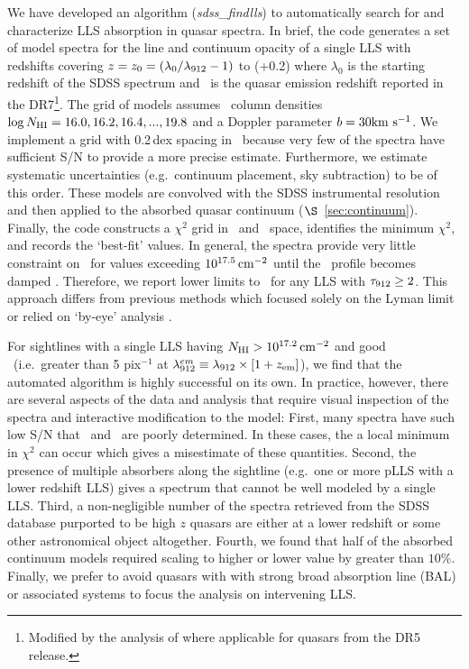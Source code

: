 \documentclass[12pt,preprint]{aastex}
\begin{document}
We have developed an algorithm ({\it sdss\_findlls})
to automatically search for
and characterize LLS absorption in quasar spectra.
In brief, the code generates a set of model spectra
for the line and continuum opacity of
a single LLS with redshifts covering 
$z=z_0=(\lambda_0/\lambda_{\rm 912}-1)$ to (\zem+0.2) where $\lambda_0$
is the starting redshift of the SDSS spectrum and \zem\ is the
quasar emission redshift reported in the DR7\footnote{Modified by
the analysis of \cite{phh08} where applicable for quasars from 
the DR5 release.}.
The grid of models assumes \nhi\ column densities 
$\log N_{\rm HI} = 16.0, 16.2, 16.4, ..., 19.8$
and a Doppler parameter $b = 30 {\rm km~s^{-1}}$.  
We implement a grid with 0.2\,dex spacing in \nhi\ because very
few of the spectra have sufficient S/N to provide a more precise
estimate.  Furthermore, we estimate systematic uncertainties
(e.g.\ continuum placement, sky subtraction) to be of this order.
These models are convolved with the SDSS instrumental
resolution and then applied to the absorbed quasar continuum 
($\S$~\ref{sec:continuum}).
Finally, the code constructs a $\chi^2$ grid in \zlls\ and \nhi\
space, identifies the minimum $\chi^2$, and records the `best-fit' values.  
In general, the spectra provide very little constraint
on \nhi\ for values exceeding $10^{17.5} \, {\rm cm^{-2}}$ until the \lya\
profile becomes damped \citep[e.g.][]{phw05}.
Therefore, we report lower limits to \nhi\ for any LLS with 
$\tau_{\rm 912} \ge 2$.  This approach differs from previous methods
which focused solely on the Lyman limit \citep[e.g.][]{sl94} or
relied on `by-eye' analysis \citep{lzt9X}.

For sightlines with a single LLS having $N_{\rm HI} > 10^{17.2} \, {\rm cm^{-2}}$
and good \sna\ (i.e.\ greater than 5 pix$^{-1}$ 
at $\lambda_{\rm 912}^{em} \equiv \lambda_{\rm 912} \times [1+z_{\rm em}]$),
we find that the automated
algorithm is highly successful on its own.
In practice, however, there are several aspects of the data and
analysis that require visual inspection of the spectra
and interactive modification to the model:
First, many spectra have 
such low S/N that \zlls\ and \nhi\ are poorly determined.
In these cases, the a local minimum in $\chi^2$ can occur which
gives a misestimate of these quantities.
Second, the presence of multiple
absorbers along the sightline (e.g.\ one or more pLLS with a lower
redshift LLS) gives a spectrum that cannot be well
modeled by a single LLS.
Third, a non-negligible number of the spectra
retrieved from the SDSS database purported to be high $z$
quasars are either at a lower redshift or some other astronomical
object altogether.  
Fourth, we found that half of the absorbed continuum models required
scaling to higher or lower value by greater than $10\%$.  
Finally,  we prefer to avoid quasars with 
with strong broad absorption line (BAL) or associated systems
to focus the analysis on intervening LLS.
\end{document}
